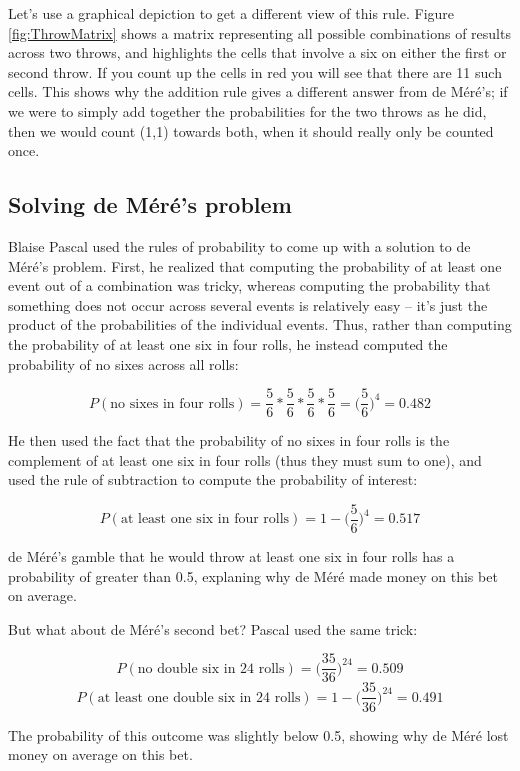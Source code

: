 \documentclass[12pt,]{book}
\theoremstyle{definition}
\theoremstyle{definition}
\theoremstyle{definition}
\theoremstyle{remark}
\begin{document}
Let's use a graphical depiction to get a different view of this rule. Figure \ref{fig:ThrowMatrix} shows a matrix representing all possible combinations of results across two throws, and highlights the cells that involve a six on either the first or second throw. If you count up the cells in red you will see that there are 11 such cells. This shows why the addition rule gives a different answer from de Méré's; if we were to simply add together the probabilities for the two throws as he did, then we would count (1,1) towards both, when it should really only be counted once.

\hypertarget{solving-de-muxe9ruxe9s-problem}{%
\subsection{Solving de Méré's problem}\label{solving-de-muxe9ruxe9s-problem}}

Blaise Pascal used the rules of probability to come up with a solution to de Méré's problem. First, he realized that computing the probability of at least one event out of a combination was tricky, whereas computing the probability that something does not occur across several events is relatively easy -- it's just the product of the probabilities of the individual events. Thus, rather than computing the probability of at least one six in four rolls, he instead computed the probability of no sixes across all rolls:

\[
P(\text{no sixes in four rolls}) = \frac{5}{6}*\frac{5}{6}*\frac{5}{6}*\frac{5}{6}=\bigg(\frac{5}{6}\bigg)^4=0.482
\]

He then used the fact that the probability of no sixes in four rolls is the complement of at least one six in four rolls (thus they must sum to one), and used the rule of subtraction to compute the probability of interest:

\[
P(\text{at least one six in four rolls}) = 1 - \bigg(\frac{5}{6}\bigg)^4=0.517
\]

de Méré's gamble that he would throw at least one six in four rolls has a probability of greater than 0.5, explaning why de Méré made money on this bet on average.

But what about de Méré's second bet? Pascal used the same trick:

\[
P(\text{no double six in 24 rolls}) = \bigg(\frac{35}{36}\bigg)^{24}=0.509
\]
\[
P(\text{at least one double six in 24 rolls}) = 1 - \bigg(\frac{35}{36}\bigg)^{24}=0.491
\]

The probability of this outcome was slightly below 0.5, showing why de Méré lost money on average on this bet.
\end{document}
